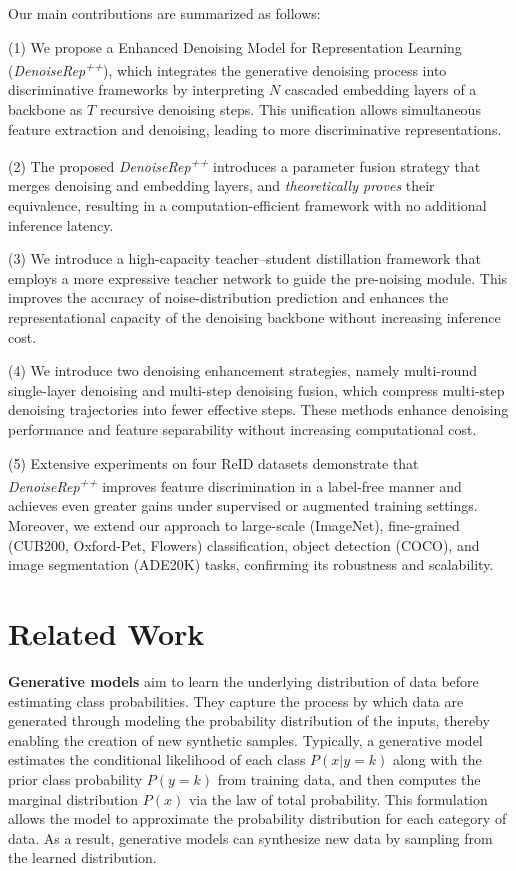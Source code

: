 \documentclass[conference]{IEEEtran}
\begin{document}
Our main contributions are summarized as follows:

(1) We propose a Enhanced Denoising Model for Representation Learning (\textit{DenoiseRep\textsuperscript{++}}), which integrates the generative denoising process into discriminative frameworks by interpreting $N$ cascaded embedding layers of a backbone as $T$ recursive denoising steps. This unification allows simultaneous feature extraction and denoising, leading to more discriminative representations.

(2) The proposed \textit{DenoiseRep\textsuperscript{++}} introduces a parameter fusion strategy that merges denoising and embedding layers, and \textit{theoretically proves} their equivalence, resulting in a computation-efficient framework with no additional inference latency.


(3) We introduce a high-capacity teacher--student distillation framework that employs a more expressive teacher network to guide the pre-noising module. This improves the accuracy of noise-distribution prediction and enhances the representational capacity of the denoising backbone without increasing inference cost.

(4) We introduce two denoising enhancement strategies, namely multi-round single-layer denoising and multi-step denoising fusion, which compress multi-step denoising trajectories into fewer effective steps. These methods enhance denoising performance and feature separability without increasing computational cost.


(5) Extensive experiments on four ReID datasets demonstrate that \textit{DenoiseRep\textsuperscript{++}} improves feature discrimination in a label-free manner and achieves even greater gains under supervised or augmented training settings.
Moreover, we extend our approach to large-scale (ImageNet), fine-grained (CUB200, Oxford-Pet, Flowers) classification, object detection (COCO), and image segmentation (ADE20K) tasks, confirming its robustness and scalability.

\section{Related Work}

\label{sec:formatting}

\textbf{Generative models} aim to learn the underlying distribution of data before estimating class probabilities.
They capture the process by which data are generated through modeling the probability distribution of the inputs, thereby enabling the creation of new synthetic samples.
Typically, a generative model estimates the conditional likelihood of each class $P(x|y = k)$ along with the prior class probability $P(y = k)$ from training data, and then computes the marginal distribution $P(x)$ via the law of total probability.
This formulation allows the model to approximate the probability distribution for each category of data.
%
As a result, generative models can synthesize new data by sampling from the learned distribution.
\end{document}
